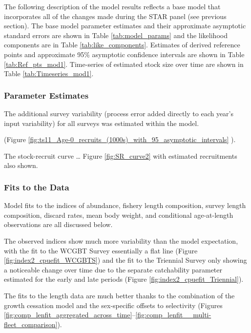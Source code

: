 \documentclass[12pt,]{article}
\begin{document}
The following description of the model results reflects a base model
that incorporates all of the changes made during the STAR panel (see
previous section). The base model parameter estimates and their
approximate asymptotic standard errors are shown in Table
\ref{tab:model_params} and the likelihood components are in Table
\ref{tab:like_components}. Estimates of derived reference points and
approximate 95\% asymptotic confidence intervals are shown in Table
\ref{tab:Ref_pts_mod1}. Time-series of estimated stock size over time
are shown in Table \ref{tab:Timeseries_mod1}.

\hypertarget{parameter-estimates}{%
\subsubsection{Parameter Estimates}\label{parameter-estimates}}

The additional survey variability (process error added directly to each
year's input variability) for all surveys was estimated within the
model.

(Figure
\ref{fig:ts11_Age-0_recruits_(1000s)_with_95_asymptotic_intervals} ).

The stock-recruit curve \ldots{} Figure \ref{fig:SR_curve2} with
estimated recruitments also shown.

\hypertarget{fits-to-the-data}{%
\subsubsection{Fits to the Data}\label{fits-to-the-data}}

Model fits to the indices of abundance, fishery length composition,
survey length composition, discard rates, mean body weight, and
conditional age-at-length observations are all discussed below.

The observed indices show much more variability than the model
expectation, with the fit to the WCGBT Survey essentially a flat line
(Figure \ref{fig:index2_cpuefit_WCGBTS}) and the fit to the Triennial
Survey only showing a noticeable change over time due to the separate
catchability parameter estimated for the early and late periods (Figure
\ref{fig:index2_cpuefit_Triennial}).

The fits to the length data are much better thanks to the combination of
the growth cessation model and the sex-specific offsets to selectivity
(Figures
\ref{fig:comp_lenfit_aggregated_across_time}--\ref{fig:comp_lenfit__multi-fleet_comparison}).
\end{document}
